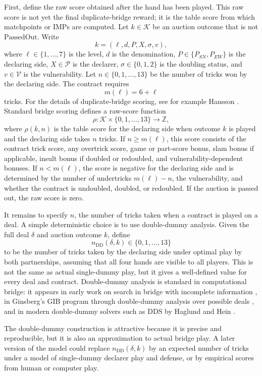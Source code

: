 \documentclass[11pt]{article}
\begin{document}
First, define the raw score obtained after the hand has been played. This raw score is not yet the final duplicate-bridge reward; it is the table score from which matchpoints or IMPs are computed. Let $k\in\mathcal{K}$ be an auction outcome that is not $\mathrm{PassedOut}$. Write
\[
    k=(\ell,d,P,X,\sigma,v),
\]
where $\ell\in\{1,\ldots,7\}$ is the level, $d$ is the denomination, $P\in\{P_{SN},P_{EW}\}$ is the declaring side, $X\in\mathcal{P}$ is the declarer, $\sigma\in\{0,1,2\}$ is the doubling status, and $v\in\mathcal{V}$ is the vulnerability. Let $n\in\{0,1,\ldots,13\}$ be the number of tricks won by the declaring side. The contract requires
\[
    m(\ell)=6+\ell
\]
tricks. For the details of duplicate-bridge scoring, see for example Hansson \cite{hansson2013introductory}. Standard bridge scoring defines a raw-score function
\[
    \rho:\mathcal{K}\times\{0,1,\ldots,13\}\to\mathbb{Z},
\]
where $\rho(k,n)$ is the table score for the declaring side when outcome $k$ is played and the declaring side takes $n$ tricks. If $n\geq m(\ell)$, this score consists of the contract trick score, any overtrick score, game or part-score bonus, slam bonus if applicable, insult bonus if doubled or redoubled, and vulnerability-dependent bonuses. If $n<m(\ell)$, the score is negative for the declaring side and is determined by the number of undertricks $m(\ell)-n$, the vulnerability, and whether the contract is undoubled, doubled, or redoubled. If the auction is passed out, the raw score is zero.

It remains to specify $n$, the number of tricks taken when a contract is played on a deal. A simple deterministic choice is to use double-dummy analysis. Given the full deal $\delta$ and auction outcome $k$, define
\[
    n_{\mathrm{DD}}(\delta,k)\in\{0,1,\ldots,13\}
\]
to be the number of tricks taken by the declaring side under optimal play by both partnerships, assuming that all four hands are visible to all players. This is not the same as actual single-dummy play, but it gives a well-defined value for every deal and contract. Double-dummy analysis is standard in computational bridge: it appears in early work on search in bridge with incomplete information \cite{frank1998search}, in Ginsberg's GIB program through double-dummy analysis over possible deals \cite{ginsberg2001gib}, and in modern double-dummy solvers such as DDS by Haglund and Hein \cite{haglunddds}.

The double-dummy construction is attractive because it is precise and reproducible, but it is also an approximation to actual bridge play. A later version of the model could replace $n_{\mathrm{DD}}(\delta,k)$ by an expected number of tricks under a model of single-dummy declarer play and defense, or by empirical scores from human or computer play.
\end{document}
